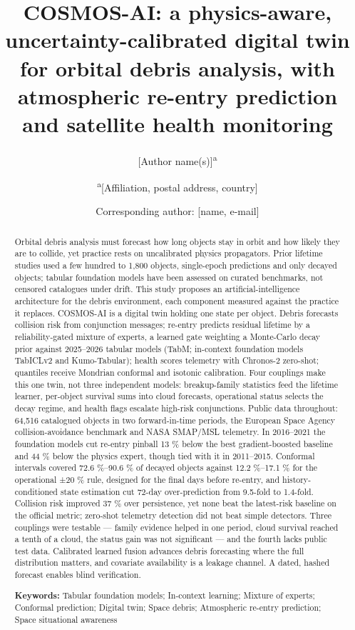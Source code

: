 \documentclass[
]{article}
\title{COSMOS-AI: a physics-aware, uncertainty-calibrated digital twin
for orbital debris analysis, with atmospheric re-entry prediction and
satellite health monitoring}
\author{{[}Author
name(s){]}\textsuperscript{a} \and \textsuperscript{a}{[}Affiliation,
postal address, country{]} \and Corresponding author: {[}name,
e-mail{]}}
\date{}
\newcounter{none} %
\begin{document}
\maketitle
\begin{abstract}
Orbital debris analysis must forecast how long objects stay in orbit and
how likely they are to collide, yet practice rests on uncalibrated
physics propagators. Prior lifetime studies used a few hundred to 1,800
objects, single-epoch predictions and only decayed objects; tabular
foundation models have been assessed on curated benchmarks, not censored
catalogues under drift. This study proposes an artificial-intelligence
architecture for the debris environment, each component measured against
the practice it replaces. COSMOS-AI is a digital twin holding one state
per object. Debris forecasts collision risk from conjunction messages;
re-entry predicts residual lifetime by a reliability-gated mixture of
experts, a learned gate weighting a Monte-Carlo decay prior against
2025--2026 tabular models (TabM; in-context foundation models TabICLv2
and Kumo-Tabular); health scores telemetry with Chronos-2 zero-shot;
quantiles receive Mondrian conformal and isotonic calibration. Four
couplings make this one twin, not three independent models:
breakup-family statistics feed the lifetime learner, per-object survival
sums into cloud forecasts, operational status selects the decay regime,
and health flags escalate high-risk conjunctions. Public data
throughout: 64,516 catalogued objects in two forward-in-time periods,
the European Space Agency collision-avoidance benchmark and NASA
SMAP/MSL telemetry. In 2016--2021 the foundation models cut re-entry
pinball 13 \% below the best gradient-boosted baseline and 44 \% below
the physics expert, though tied with it in 2011--2015. Conformal
intervals covered 72.6 \%--90.6 \% of decayed objects against 12.2
\%--17.1 \% for the operational ±20 \% rule, designed for the final days
before re-entry, and history-conditioned state estimation cut 72-day
over-prediction from 9.5-fold to 1.4-fold. Collision risk improved 37 \%
over persistence, yet none beat the latest-risk baseline on the official
metric; zero-shot telemetry detection did not beat simple detectors.
Three couplings were testable --- family evidence helped in one period,
cloud survival reached a tenth of a cloud, the status gain was not
significant --- and the fourth lacks public test data. Calibrated
learned fusion advances debris forecasting where the full distribution
matters, and covariate availability is a leakage channel. A dated,
hashed forecast enables blind verification.

\textbf{Keywords:} Tabular foundation models; In-context learning;
Mixture of experts; Conformal prediction; Digital twin; Space debris;
Atmospheric re-entry prediction; Space situational awareness
\end{abstract}
\end{document}
